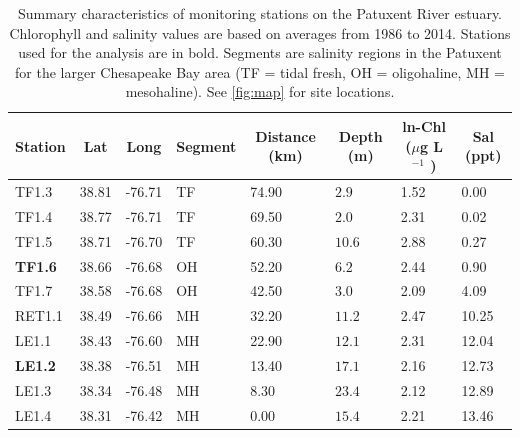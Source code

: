 \documentclass[letterpaper,12pt,oneside]{article}\usepackage[]{graphicx}\usepackage[]{color}
\newcommand{\mugl}{$\mu$g L$^{-1}$ }
\begin{document}
\begin{table}[!tbp]
\caption{Summary characteristics of monitoring stations on the Patuxent River estuary.  Chlorophyll and salinity values are based on averages from 1986 to 2014.  Stations used for the analysis are in bold.  Segments are salinity regions in the Patuxent for the larger Chesapeake Bay area (TF = tidal fresh, OH = oligohaline, MH = mesohaline).  See \cref{fig:map} for site locations.\label{tab:statsum}} 
\begin{center}
\begin{tabular}{llllllll}
\hline\hline
\multicolumn{1}{l}{Station}&\multicolumn{1}{c}{Lat}&\multicolumn{1}{c}{Long}&\multicolumn{1}{c}{Segment}&\multicolumn{1}{c}{Distance (km)}&\multicolumn{1}{c}{Depth (m)}&\multicolumn{1}{c}{ln-Chl (\mugl)}&\multicolumn{1}{c}{Sal (ppt)}\tabularnewline
\hline
TF1.3&38.81&-76.71&TF&74.90&$ 2.9$&1.52& 0.00\tabularnewline
TF1.4&38.77&-76.71&TF&69.50&$ 2.0$&2.31& 0.02\tabularnewline
TF1.5&38.71&-76.70&TF&60.30&$10.6$&2.88& 0.27\tabularnewline
{\bf TF1.6}&38.66&-76.68&OH&52.20&$ 6.2$&2.44& 0.90\tabularnewline
TF1.7&38.58&-76.68&OH&42.50&$ 3.0$&2.09& 4.09\tabularnewline
RET1.1&38.49&-76.66&MH&32.20&$11.2$&2.47&10.25\tabularnewline
LE1.1&38.43&-76.60&MH&22.90&$12.1$&2.31&12.04\tabularnewline
{\bf LE1.2}&38.38&-76.51&MH&13.40&$17.1$&2.16&12.73\tabularnewline
LE1.3&38.34&-76.48&MH& 8.30&$23.4$&2.12&12.89\tabularnewline
LE1.4&38.31&-76.42&MH& 0.00&$15.4$&2.21&13.46\tabularnewline
\hline
\end{tabular}\end{center}

\end{table}
\end{document}
